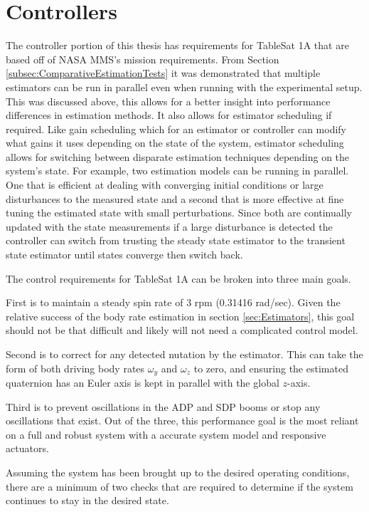 \section{Controllers}
\label{sec:Controller}

The controller portion of this thesis has requirements for TableSat 1A that are based off of NASA MMS's mission requirements.  From Section \ref{subsec:ComparativeEstimationTests} it was demonstrated that multiple estimators can be run in parallel even when running with the experimental setup.  This was discussed above, this allows for a better insight into performance differences in estimation methods.  It also allows for estimator scheduling if required.  Like gain scheduling which for an estimator or controller can modify what gains it uses depending on the state of the system, estimator scheduling allows for switching between disparate estimation techniques depending on the system's state.  For example, two estimation models can be running in parallel.  One that is efficient at dealing with converging initial conditions or large disturbances to the measured state and a second that is more effective at fine tuning the estimated state with small perturbations.  Since both are continually updated with the state measurements if a large disturbance is detected the controller can switch from trusting the steady state estimator to the transient state estimator until states converge then switch back.

The control requirements for TableSat 1A can be broken into three main goals.

First is to maintain a steady spin rate of 3 rpm (0.31416 rad/sec).  Given the relative success of the body rate estimation in section \ref{sec:Estimators}, this goal should not be that difficult and likely will not need a complicated control model.

Second is to correct for any detected nutation by the estimator.  This can take the form of both driving body rates $\omega_y$ and $\omega_z$ to zero, and ensuring the estimated quaternion has an Euler axis is kept in parallel with the global $z$-axis.

Third is to prevent oscillations in the ADP and SDP booms or stop any oscillations that exist.  Out of the three, this performance goal is the most reliant on a full and robust system with a accurate system model and responsive actuators.

Assuming the system has been brought up to the desired operating conditions, there are a minimum of two checks that are required to determine if the system continues to stay in the desired state.

